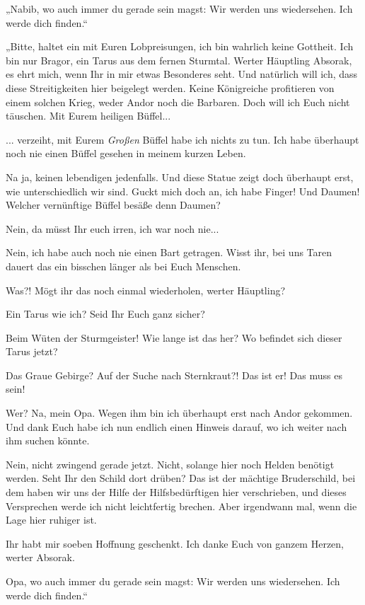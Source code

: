 „Nabib, wo auch immer du gerade sein magst: Wir werden uns wiedersehen. Ich werde dich finden.“



\trennzeichen



„Bitte, haltet ein mit Euren Lobpreisungen, ich bin wahrlich keine Gottheit. Ich bin nur Bragor, ein Tarus aus dem fernen Sturmtal. Werter Häuptling Absorak, es ehrt mich, wenn Ihr in mir etwas Besonderes seht. Und natürlich will ich, dass diese Streitigkeiten hier beigelegt werden. Keine Königreiche profitieren von einem solchen Krieg, weder Andor noch die Barbaren. Doch will ich Euch nicht täuschen. Mit Eurem heiligen Büffel...

... verzeiht, mit Eurem \textit{Großen} Büffel habe ich nichts zu tun. Ich habe überhaupt noch nie einen Büffel gesehen in meinem kurzen Leben.

Na ja, keinen lebendigen jedenfalls. Und diese Statue zeigt doch überhaupt erst, wie unterschiedlich wir sind. Guckt mich doch an, ich habe Finger! Und Daumen! Welcher vernünftige Büffel besäße denn Daumen?

Nein, da müsst Ihr euch irren, ich war noch nie...

Nein, ich habe auch noch nie einen Bart getragen. Wisst ihr, bei uns Taren dauert das ein bisschen länger als bei Euch Menschen.

Was?! Mögt ihr das noch einmal wiederholen, werter Häuptling?

Ein Tarus wie ich? Seid Ihr Euch ganz sicher?

Beim Wüten der Sturmgeister! Wie lange ist das her? Wo befindet sich dieser Tarus jetzt?

Das Graue Gebirge? Auf der Suche nach Sternkraut?! Das ist er! Das muss es sein!

Wer? Na, mein Opa. Wegen ihm bin ich überhaupt erst nach Andor gekommen. Und dank Euch habe ich nun endlich einen Hinweis darauf, wo ich weiter nach ihm suchen könnte.

Nein, nicht zwingend gerade jetzt. Nicht, solange hier noch Helden benötigt werden. Seht Ihr den Schild dort drüben? Das ist der mächtige Bruderschild, bei dem haben wir uns der Hilfe der Hilfsbedürftigen hier verschrieben, und dieses Versprechen werde ich nicht leichtfertig brechen. Aber irgendwann mal, wenn die Lage hier ruhiger ist.

Ihr habt mir soeben Hoffnung geschenkt. Ich danke Euch von ganzem Herzen, werter Absorak.

Opa, wo auch immer du gerade sein magst: Wir werden uns wiedersehen. Ich werde dich finden.“


